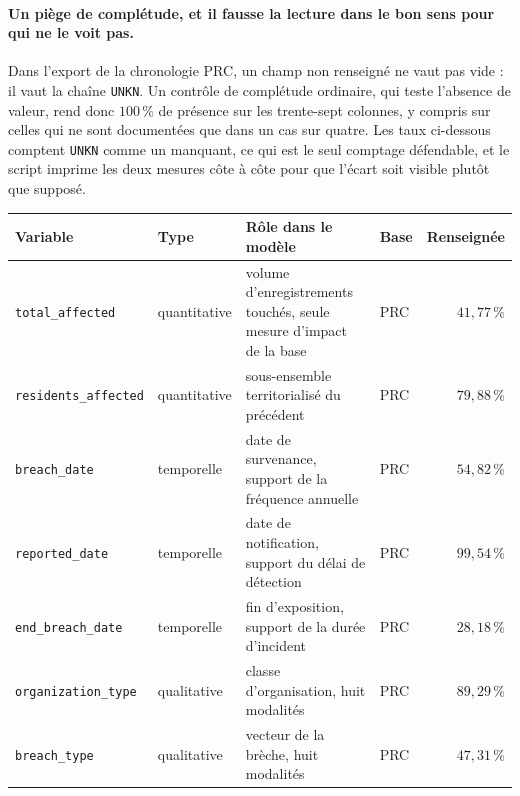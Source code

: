 \paragraph{Un piège de complétude, et il fausse la lecture dans le bon sens pour qui ne le voit
pas.} Dans l'export de la chronologie PRC, un champ non renseigné ne vaut pas vide : il vaut la
chaîne \texttt{UNKN}. Un contrôle de complétude ordinaire, qui teste l'absence de valeur, rend
donc $100\,\%$ de présence sur les trente-sept colonnes, y compris sur celles qui ne sont
documentées que dans un cas sur quatre. Les taux ci-dessous comptent \texttt{UNKN} comme un
manquant, ce qui est le seul comptage défendable, et le script imprime les deux mesures côte à
côte pour que l'écart soit visible plutôt que supposé.

\begin{center}\small
\renewcommand{\arraystretch}{1.15}
\begin{tabular}{@{}l l p{4.6cm} l r@{}}
\toprule
\textbf{Variable} & \textbf{Type} & \textbf{Rôle dans le modèle} & \textbf{Base} &
\textbf{Renseignée} \\
\midrule
\texttt{total\_affected}      & quantitative & volume d'enregistrements touchés, seule mesure
                                               d'impact de la base & PRC & $41{,}77\,\%$ \\
\texttt{residents\_affected}  & quantitative & sous-ensemble territorialisé du précédent
                                             & PRC & $79{,}88\,\%$ \\
\texttt{breach\_date}         & temporelle   & date de survenance, support de la fréquence annuelle
                                             & PRC & $54{,}82\,\%$ \\
\texttt{reported\_date}       & temporelle   & date de notification, support du délai de détection
                                             & PRC & $99{,}54\,\%$ \\
\texttt{end\_breach\_date}    & temporelle   & fin d'exposition, support de la durée d'incident
                                             & PRC & $28{,}18\,\%$ \\
\texttt{organization\_type}   & qualitative  & classe d'organisation, huit modalités
                                             & PRC & $89{,}29\,\%$ \\
\texttt{breach\_type}         & qualitative  & vecteur de la brèche, huit modalités
                                             & PRC & $47{,}31\,\%$ \\
\midrule

\end{tabular}
\end{center}

